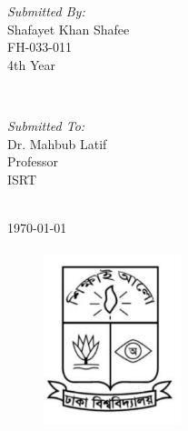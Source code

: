 \documentclass[
  12pt,
  oneside]{article}
\begin{document}
\begin{titlepage}
\begin{minipage}{0.4\textwidth}
\begin{flushleft} \large
\emph{Submitted By:}\\
Shafayet Khan Shafee \\FH-033-011\\4th Year
\end{flushleft}
\end{minipage}
~
\begin{minipage}{0.4\textwidth}
\begin{flushright} \large
\emph{Submitted To:} \\
Dr. Mahbub Latif\\Professor\\ISRT
\end{flushright}
\end{minipage}\\[1cm]


{\large \today}\\[3cm]


\begin{figure}[hb]
  \centering
  \includegraphics[width=4cm, height=5.2cm]{../others/logo.JPG}
\end{figure}



\vfill

\end{titlepage}

{
\setcounter{tocdepth}{2}
\tableofcontents
}
\clearpage
\end{document}
